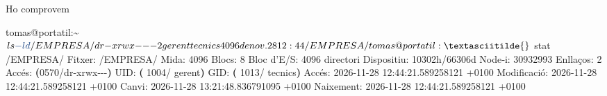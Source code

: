 \documentclass[
  catalan,
  a4paper,
]{article}
\newenvironment{Shaded}{\begin{snugshade}}{\end{snugshade}}
\newcommand{\AttributeTok}[1]{\textcolor[rgb]{0.13,0.29,0.53}{#1}}
\newcommand{\ErrorTok}[1]{\textcolor[rgb]{0.64,0.00,0.00}{\textbf{#1}}}
\newcommand{\ExtensionTok}[1]{#1}
\newcommand{\KeywordTok}[1]{\textcolor[rgb]{0.13,0.29,0.53}{\textbf{#1}}}
\newcommand{\NormalTok}[1]{#1}
\begin{document}
\begin{Shaded}
\end{Shaded}

Ho comprovem

\begin{Shaded}
\begin{Highlighting}[]
\ExtensionTok{tomas@portatil:\textasciitilde{}$}\NormalTok{ ls }\AttributeTok{{-}ld}\NormalTok{ /EMPRESA/}
\ExtensionTok{dr{-}xrwx{-}{-}{-}}\NormalTok{ 2 gerent tecnics 4096 de nov.  28 12:44 /EMPRESA/}
\ExtensionTok{tomas@portatil:\textasciitilde{}$}\NormalTok{ stat /EMPRESA/}
  \ExtensionTok{Fitxer:}\NormalTok{ /EMPRESA/}
       \ExtensionTok{Mida:}\NormalTok{ 4096       Blocs: 8          Bloc d’E/S: 4096   directori}
\ExtensionTok{Dispositiu:}\NormalTok{ 10302h/66306d   Node‐i: 30932993    Enllaços: 2}
\ExtensionTok{Accés:} \ErrorTok{(}\ExtensionTok{0570/dr{-}xrwx{-}{-}{-}}\KeywordTok{)}  \ExtensionTok{UID:} \ErrorTok{(} \ExtensionTok{1004/}\NormalTok{  gerent}\KeywordTok{)}   \ExtensionTok{GID:} \ErrorTok{(} \ExtensionTok{1013/}\NormalTok{ tecnics}\KeywordTok{)}
\ExtensionTok{Accés:}\NormalTok{ 2026{-}11{-}28 12:44:21.589258121 +0100}
\ExtensionTok{Modificació:}\NormalTok{ 2026{-}11{-}28 12:44:21.589258121 +0100}
      \ExtensionTok{Canvi:}\NormalTok{ 2026{-}11{-}28 13:21:48.836791095 +0100}
  \ExtensionTok{Naixement:}\NormalTok{ 2026{-}11{-}28 12:44:21.589258121 +0100}
\end{Highlighting}
\end{Shaded}
\end{document}
